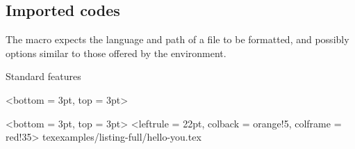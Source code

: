 \documentclass{tutodoc}
\begin{document}
\subsection{Imported codes}

The  macro expects the language and path of a file to be formatted, and possibly options similar to those offered by the  environment.


\begin{tdocexa}{Standard features}
	\leavevmode

    \begin{tdoclatex}<bottom = 3pt, top = 3pt>
    \end{tdoclatex}
\end{tdocexa}


\begin{tdocexa}
	\leavevmode

    \begin{tdoclatex}<bottom = 3pt, top = 3pt>
\tdoccodeinput[style = solarized-light, linenos]%
              <leftrule = 22pt, colback = orange!5, colframe = red!35>%
              {tex}{examples/listing-full/hello-you.tex}
    \end{tdoclatex}
\end{tdocexa}
\end{document}
